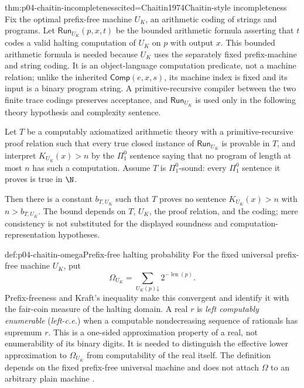 \begin{hbtheorem}{thm:p04-chaitin-incompleteness}{cited=Chaitin1974}{Chaitin-style incompleteness}
Fix the optimal prefix-free machine \(U_K\), an arithmetic coding of strings and
programs.  Let \(\mathsf{Run}_{U_K}(p,x,t)\) be the bounded arithmetic
formula asserting that \(t\) codes a valid halting computation of \(U_K\) on
\(p\) with output \(x\).  This bounded arithmetic formula is needed because
\(U_K\) uses the separately fixed prefix-machine and string coding.  It is an
object-language computation predicate, not a machine relation; unlike the
inherited \(\mathsf{Comp}(e,x,s)\), its machine index is fixed and its input
is a binary program string.  A primitive-recursive compiler between the two
finite trace codings preserves acceptance, and
\(\mathsf{Run}_{U_K}\) is used only in the following theory hypothesis and
complexity sentence.

Let \(T\) be a computably axiomatized arithmetic
theory with a primitive-recursive proof relation such that every true closed
instance of \(\mathsf{Run}_{U_K}\) is provable in \(T\), and interpret
\(K_{U_K}(x)>n\) by the \(\Pi^0_1\) sentence saying that no program of length
at most \(n\) has such a computation.  Assume \(T\) is \(\Pi^0_1\)-sound:
every \(\Pi^0_1\) sentence it proves is true in \(\N\).

Then there is a constant \(b_{T,U_K}\) such that \(T\) proves no sentence
\(K_{U_K}(x)>n\) with \(n>b_{T,U_K}\).  The bound depends on \(T\), \(U_K\),
the proof relation, and the coding; mere consistency is not substituted for
the displayed soundness and computation-representation hypotheses.
\end{hbtheorem}

\begin{hbdefinition}{def:p04-chaitin-omega}{Prefix-free halting probability}
For the fixed universal prefix-free machine \(U_K\), put
\[
 \Omega_{U_K}=\sum_{U_K(p)\mathord\downarrow}2^{-\operatorname{len}(p)}.
\]
Prefix-freeness and Kraft's inequality make this convergent and identify it
with the fair-coin measure of the halting domain.  A real \(r\) is
\emph{left computably enumerable} (\emph{left-c.e.}) when a computable nondecreasing sequence of
rationals has supremum \(r\).  This is a one-sided approximation property of a
real, not enumerability of its binary digits.  It is needed to distinguish the
effective lower approximation to \(\Omega_{U_K}\) from computability of the
real itself.  The definition depends on the fixed prefix-free universal
machine and does not attach \(\Omega\) to an arbitrary plain machine
\cite{Chaitin1975,LiVitanyi2008}.
\end{hbdefinition}

